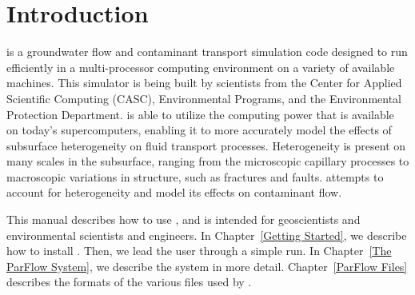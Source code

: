 
\chapter{Introduction}
\label{Introduction}

\parflow{} is a groundwater flow and contaminant transport simulation code
designed to run efficiently in a multi-processor computing environment
on a variety of available machines.  This simulator is being built by
scientists from the Center for Applied Scientific Computing (CASC),
Environmental Programs, and the Environmental Protection Department.
\parflow{} is able to utilize the computing power that is
available on today's supercomputers, enabling it to more accurately model
the effects of subsurface heterogeneity on fluid transport processes.
Heterogeneity is present on many scales in the subsurface, ranging
from the microscopic capillary processes to macroscopic variations in
structure, such as fractures and faults.
\parflow{} attempts to account for heterogeneity and model its
effects on contaminant flow.

This manual describes how to use \parflow{}, and is intended for
geoscientists and environmental scientists and engineers.  In
Chapter~\ref{Getting Started}, we describe how to install \parflow{}.
Then, we lead the user through a simple \parflow{} run.  In
Chapter~\ref{The ParFlow System}, we describe the \parflow{} system in
more detail.  Chapter~\ref{ParFlow Files} describes the formats of the
various files used by \parflow{}.


